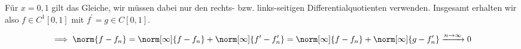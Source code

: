 \begin{solution}
\begin{enumerate}[label = \arabic*.]
    Für $x = 0, 1$ gilt das Gleiche, wir müssen dabei nur den rechts- bzw. links-seitigen Differentialquotienten verwenden.
    Insgesamt erhalten wir also $f \in C^1[0, 1]$ mit $f^\prime = g \in C[0, 1]$.

    \begin{align*}
        \implies
        \norm{f - f_n}
        =
        \norm[\infty]{f - f_n} + \norm[\infty]{f^\prime - f_n^\prime}
        =
        \norm[\infty]{f - f_n} + \norm[\infty]{g - f_n^\prime}
        \xrightarrow{n \to \infty}
        0        
    \end{align*}

\end{enumerate}

\end{solution}


